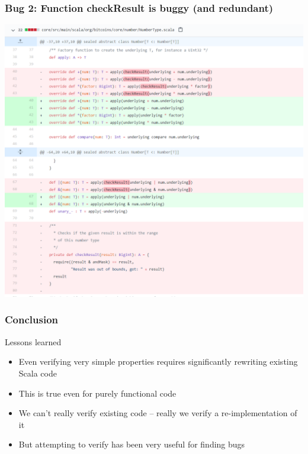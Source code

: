 \documentclass{beamer}
\begin{document}
\begin{frame}
\frametitle{Bug 2: Function checkResult is buggy (and redundant)}
\includegraphics[width=.85\textwidth]{bug2.png}
\end{frame}

\begin{frame}
\frametitle{Conclusion}
\begin{block}{Lessons learned}
  \begin{itemize}
  \item Even verifying very simple properties requires significantly rewriting existing Scala code
  \item This is true even for purely functional code
  \item We can't really verify existing code -- really we verify a re-implementation of it
  \item But attempting to verify has been very useful for finding bugs
  \end{itemize}
\end{block}

\end{frame}
\end{document}
